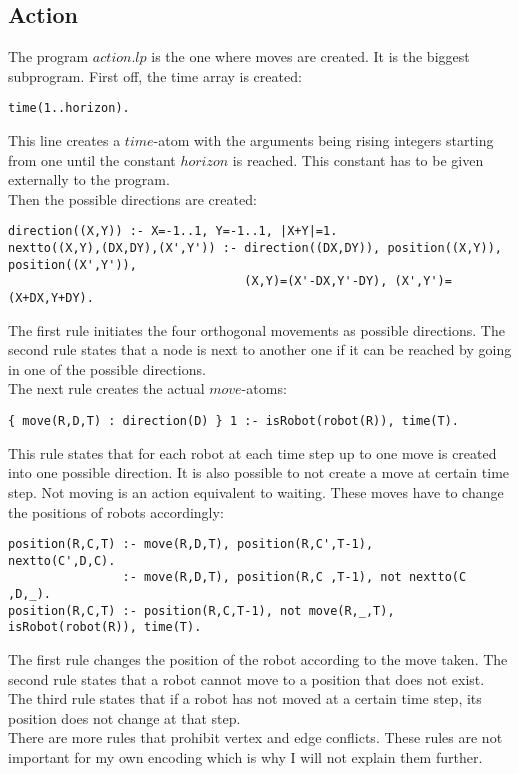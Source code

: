 \documentclass[runningheads]{llncs}
\begin{document}
\subsection{Action}
The program $action.lp$ is the one where moves are created. It is the biggest subprogram. First off, the time array is created:
\begin{verbatim}
time(1..horizon).
\end{verbatim}
This line creates a $time$-atom with the arguments being rising integers starting from one until the constant $horizon$ is reached. This constant has to be given externally to the program.  \\
Then the possible directions are created:
\begin{verbatim}
direction((X,Y)) :- X=-1..1, Y=-1..1, |X+Y|=1.
nextto((X,Y),(DX,DY),(X',Y')) :- direction((DX,DY)), position((X,Y)), position((X',Y')),
                                 (X,Y)=(X'-DX,Y'-DY), (X',Y')=(X+DX,Y+DY).
\end{verbatim}
The first rule initiates the four orthogonal movements as possible directions. The second rule states that a node is next to another one if it can be reached by going in one of the possible directions. \\
The next rule creates the actual $move$-atoms:
\begin{verbatim}
{ move(R,D,T) : direction(D) } 1 :- isRobot(robot(R)), time(T).
\end{verbatim}
This rule states that for each robot at each time step up to one move is created into one possible direction. It is also possible to not create a move at certain time step. Not moving is an action equivalent to waiting. These moves have to change the positions of robots accordingly:
\begin{verbatim}
position(R,C,T) :- move(R,D,T), position(R,C',T-1),     nextto(C',D,C).
                :- move(R,D,T), position(R,C ,T-1), not nextto(C ,D,_).
position(R,C,T) :- position(R,C,T-1), not move(R,_,T), isRobot(robot(R)), time(T).
\end{verbatim}
The first rule changes the position of the robot according to the move taken. The second rule states that a robot cannot move to a position that does not exist. The third rule states that if a robot has not moved at a certain time step, its position does not change at that step. \\
There are more rules that prohibit vertex and edge conflicts. These rules are not important for my own encoding which is why I will not explain them further. 
\end{document}
